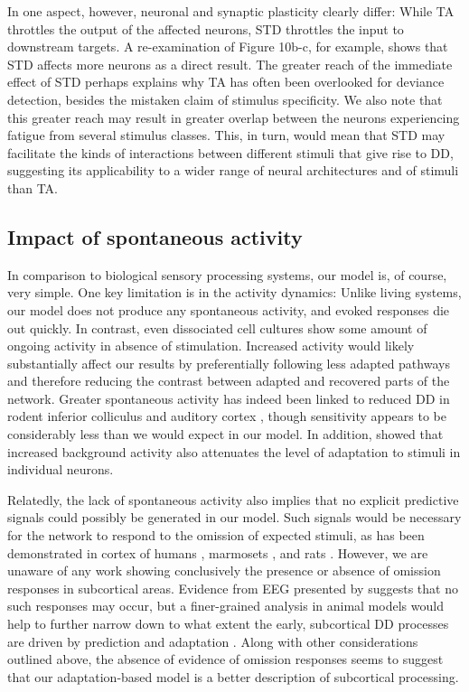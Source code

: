 \documentclass[9pt,lineno,onehalfspacing]{elife}
\begin{document}
In one aspect, however, neuronal and synaptic plasticity clearly differ: While TA throttles the output of the affected neurons, STD throttles the input to downstream targets. A re-examination of Figure 10b-c, for example, shows that STD affects more neurons as a direct result. The greater reach of the immediate effect of STD perhaps explains why TA has often been overlooked for deviance detection, besides the mistaken claim of stimulus specificity. We also note that this greater reach may result in greater overlap between the neurons experiencing fatigue from several stimulus classes. This, in turn, would mean that STD may facilitate the kinds of interactions between different stimuli that give rise to DD, suggesting its applicability to a wider range of neural architectures and of stimuli than TA.

\subsection{Impact of spontaneous activity}

In comparison to biological sensory processing systems, our model is, of course, very simple. One key limitation is in the activity dynamics: Unlike living systems, our model does not produce any spontaneous activity, and evoked responses die out quickly. In contrast, even dissociated cell cultures show some amount of ongoing activity in absence of stimulation. Increased activity would likely substantially affect our results by preferentially following less adapted pathways and therefore reducing the contrast between adapted and recovered parts of the network. Greater spontaneous activity has indeed been linked to reduced DD in rodent inferior colliculus \citep{Duque2012-vx, Duque2015-eu} and auditory cortex \citep{Klein2014-op}, though sensitivity appears to be considerably less than we would expect in our model. In addition, \cite{Abolafia2011-ig} showed that increased background activity also attenuates the level of adaptation to stimuli in individual neurons.

Relatedly, the lack of spontaneous activity also implies that no explicit predictive signals could possibly be generated in our model. Such signals would be necessary for the network to respond to the omission of expected stimuli, as has been demonstrated in cortex of humans \citep{Lehmann2016-ol, Demarchi2019-ch}, marmosets \citep{Jiang2022-ak}, and rats \citep{Auksztulewicz2022-gq}. However, we are unaware of any work showing conclusively the presence or absence of omission responses in subcortical areas. Evidence from EEG presented by \cite{Lehmann2016-ol} suggests that no such responses may occur, but a finer-grained analysis in animal models would help to further narrow down to what extent the early, subcortical DD processes are driven by prediction and adaptation \citep{Schlossmacher2022-zv}. Along with other considerations outlined above, the absence of evidence of omission responses seems to suggest that our adaptation-based model is a better description of subcortical processing.
\end{document}
